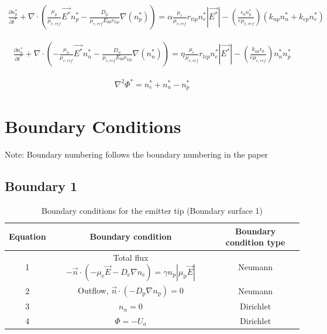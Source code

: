 \documentclass[12pt, a4paper]{report}
\begin{document}
\begin{align*}
        \frac{\partial n_p^* }{\partial t^*} + \nabla \cdot \left(\frac{\mu_p}{\mu_{e,ref}} \vec{E^*}n_p^* - \frac{{D_p}}{\mu_{e,ref} E_{bd}r_{tip}}\nabla (n_p^*)\right) = \alpha \frac{\mu_e}{\mu_{e,ref}}r_{tip} n_e^*|\vec{E^*}| - \left(\frac{\epsilon_0 n_p^*}{e \mu_{e,ref}} \right) \left(k_{np}n_n^* + k_{ep}n_e^*\right)
\end{align*}

\begin{align*}
        \frac{\partial n_n^* }{\partial t^*} + \nabla \cdot \left(-\frac{\mu_n}{\mu_{e,ref}} \vec{E^*}n_n^* - \frac{{D_n}}{\mu_{e,ref} E_{bd}r_{tip}}\nabla (n_n^*)\right) = \eta \frac{\mu_e}{\mu_{e,ref}}r_{tip} n_e^*|\vec{E^*}| - \left(\frac{k_{np} \epsilon_0}{e \mu_{e,ref}} \right) n_n^*n_p^*
\end{align*}

\begin{align*}
    \nabla^2\Phi^* = n_e^*+n_n^*-n_p^*
\end{align*}

\section{\bf \large Boundary Conditions}
Note: Boundary numbering follows the boundary numbering in the paper
\subsection{Boundary 1}

\begin{table}[!h]
    \centering\begin{tabular}{c|c|c}
        Equation & Boundary condition & Boundary condition type\\ \hline
        1 & Total flux $-\vec{n} \cdot\left(-\mu_{\mathrm{e}} \vec{E} -D_{\mathrm{e}} \nabla n_{\mathrm{e}}\right) =\gamma n_{\mathrm{p}}|\mu_{\mathrm{p}} \vec{E}|$ & Neumann \\ \hline
        2 & Outflow, $\vec{n} \cdot\left(-D_{\mathrm{p}} \nabla n_{\mathrm{p}}\right)=0$  & Neumann \\ \hline
        3 & $n_n=0$ & Dirichlet\\ \hline
        4 & $\Phi=-U_a$ & Dirichlet \\ \hline

    \end{tabular}
    \caption{Boundary conditions for the emitter tip (Boundary surface 1)}
\end{table}
\clearpage
\end{document}
